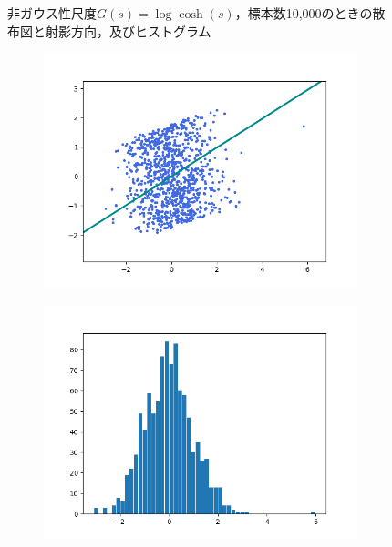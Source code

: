 \documentclass[class=jsarticle, crop=false, dvipdfmx, fleqn]{standalone}
\begin{document}
\begin{figure}
\begin{minipage}{0.45\linewidth}
\begin{figure}[H]
            \label{fig:logcosh_n10000_hist}
        \end{figure}
    \end{minipage}
    \caption{非ガウス性尺度\(G(s) = \log\cosh(s)\)，標本数10,000のときの散布図と射影方向，及びヒストグラム}
    \label{fig:logcosh_n10000}
\end{figure}


\clearpage
\begin{figure}
	\centering
    \begin{minipage}{0.45\linewidth}
        \begin{figure}[H]
        	   \centering
            \includegraphics[clip, width=\linewidth]{../figures/assignment2_result_exp_n1000_scatter.png}
            \label{fig:exp_n1000_scatter}
        \end{figure}
    \end{minipage}
    \begin{minipage}{0.45\linewidth}
        \begin{figure}[H]
            \centering
            \includegraphics[clip, width=\linewidth]{../figures/assignment2_result_exp_n1000_hist.png}

\end{figure}
\end{minipage}
\end{figure}
\end{document}
